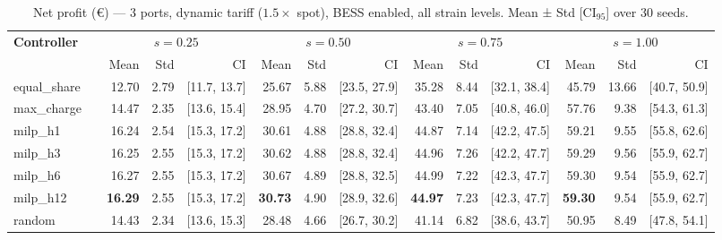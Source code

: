 \begin{table}[!htb]
\centering
\caption{Net profit (€) — 3 ports, dynamic tariff ($1.5\times$ spot), BESS enabled,
         all strain levels. Mean ± Std [CI$_{95}$] over 30 seeds.}
\label{tab:gc_3port_dynamic}
\setlength{\tabcolsep}{3pt}
\begin{tabular}{lp{1cm} rrr rrr rrr rrr}
\toprule
\textbf{Controller} & &
  \multicolumn{3}{c}{$s=0.25$} &
  \multicolumn{3}{c}{$s=0.50$} &
  \multicolumn{3}{c}{$s=0.75$} &
  \multicolumn{3}{c}{$s=1.00$} \\
\cmidrule(lr){3-5}\cmidrule(lr){6-8}\cmidrule(lr){9-11}\cmidrule(lr){12-14}
 & & Mean & Std & CI & Mean & Std & CI & Mean & Std & CI & Mean & Std & CI \\
\midrule
equal\_share & &  12.70 &  2.79 & [11.7, 13.7] &  25.67 &  5.88 & [23.5, 27.9] &  35.28 &  8.44 & [32.1, 38.4] &  45.79 & 13.66 & [40.7, 50.9] \\
max\_charge  & &  14.47 &  2.35 & [13.6, 15.4] &  28.95 &  4.70 & [27.2, 30.7] &  43.40 &  7.05 & [40.8, 46.0] &  57.76 &  9.38 & [54.3, 61.3] \\
milp\_h1     & &  16.24 &  2.54 & [15.3, 17.2] &  30.61 &  4.88 & [28.8, 32.4] &  44.87 &  7.14 & [42.2, 47.5] &  59.21 &  9.55 & [55.8, 62.6] \\
milp\_h3     & &  16.25 &  2.55 & [15.3, 17.2] &  30.62 &  4.88 & [28.8, 32.4] &  44.96 &  7.26 & [42.2, 47.7] &  59.29 &  9.56 & [55.9, 62.7] \\
milp\_h6     & &  16.27 &  2.55 & [15.3, 17.2] &  30.67 &  4.89 & [28.8, 32.5] &  44.99 &  7.22 & [42.3, 47.7] &  59.30 &  9.54 & [55.9, 62.7] \\
milp\_h12    & & \textbf{16.29} &  2.55 & [15.3, 17.2] & \textbf{30.73} &  4.90 & [28.9, 32.6] & \textbf{44.97} &  7.23 & [42.3, 47.7] & \textbf{59.30} &  9.54 & [55.9, 62.7] \\
random       & &  14.43 &  2.34 & [13.6, 15.3] &  28.48 &  4.66 & [26.7, 30.2] &  41.14 &  6.82 & [38.6, 43.7] &  50.95 &  8.49 & [47.8, 54.1] \\
\bottomrule
\end{tabular}
\end{table}

